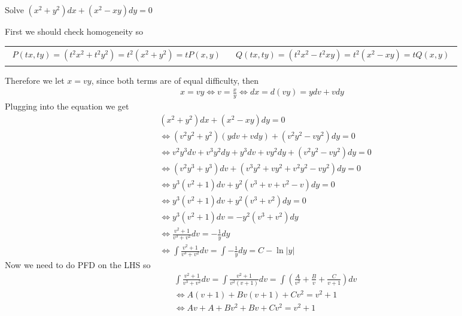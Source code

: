 \documentclass[notes.tex]{subfiles}
\begin{document}
\begin{exercise}
    Solve $(x^2 + y^2)dx + (x^2 - xy)dy = 0$
\end{exercise}
\begin{solution}
    First we should check homogeneity so \\
    \begin{tabularx}{\textwidth}{X X}
        \begin{align*}
        P(tx, ty) = (t^2x^2 + t^2y^2) = t^2(x^2 + y^2) = tP(x, y)
        \end{align*}
        &
        \begin{align*}
        Q(tx, ty) = (t^2x^2 - t^2xy) = t^2(x^2 - xy) = tQ(x, y)
        \end{align*}
    \end{tabularx}
    Therefore we let $x = vy$, since both terms are of equal difficulty, then
    \begin{align*}
        x = vy \iff v = \frac{x}{y} \iff dx = d(vy) = ydv + vdy
    \end{align*}
    Plugging into the equation we get
    \begin{align*}
        &(x^2 + y^2)dx + (x^2 - xy)dy = 0 \\
        &\iff (v^2y^2 + y^2)(ydv + vdy) + (v^2y^2 - vy^2)dy = 0 \\
        &\iff v^2y^3dv + v^3y^2dy + y^3dv + vy^2dy + (v^2y^2 - vy^2)dy = 0 \\
        &\iff (v^2y^3 + y^3)dv + (v^3y^2 + vy^2 + v^2y^2 - vy^2)dy = 0 \\
        &\iff y^3(v^2 + 1)dv + y^2(v^3 + v + v^2 - v)dy = 0 \\
        &\iff y^3(v^2 + 1)dv + y^2(v^3 + v^2)dy = 0 \\
        &\iff y^3(v^2 + 1)dv = -y^2(v^3 + v^2)dy \\
        &\iff \frac{v^2 + 1}{v^3 + v^2}dv = -\frac{1}{y}dy \\
        &\iff \int \frac{v^2 + 1}{v^3 + v^2}dv = \int -\frac{1}{y}dy = C - \ln|y|
    \end{align*}
    Now we need to do PFD on the LHS so
    \begin{align*}
        &\int \frac{v^2 + 1}{v^3 + v^2}dv = \int \frac{v^2 + 1}{v^2(v + 1)}dv = \int \left( \frac{A}{v^2} + \frac{B}{v} + \frac{C}{v + 1} \right)dv \\
        &\iff A(v + 1) + Bv(v + 1) + Cv^2 = v^2 + 1 \\
        &\iff Av + A + Bv^2 + Bv + Cv^2 = v^2 + 1 \\

\end{align*}
\end{solution}
\end{document}
